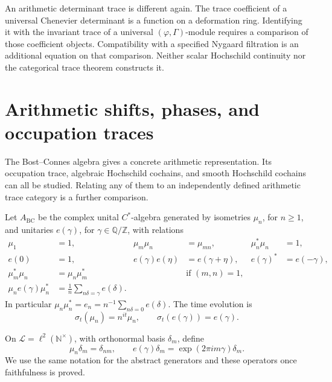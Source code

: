 An arithmetic determinant trace is different again. The trace coefficient of
a universal Chenevier determinant is a function on a deformation ring.
Identifying it with the invariant trace of a universal
$(\varphi,\Gamma)$-module requires a comparison of those coefficient
objects. Compatibility with a specified Nygaard filtration is an additional
equation on that comparison. Neither scalar Hochschild continuity nor the
categorical trace theorem constructs it.

\section{Arithmetic shifts, phases, and occupation traces}

The Bost--Connes algebra gives a concrete arithmetic representation. Its
occupation trace, algebraic Hochschild cochains, and smooth Hochschild
cochains can all be studied. Relating any of them to an independently
defined arithmetic trace category is a further comparison.

\begin{definition}
\label{v4-arith:traces:bc-algebra}
Let $A_{\mathrm{BC}}$ be the complex unital $C^*$-algebra generated by
isometries $\mu_n$, for $n\geq1$, and unitaries $e(\gamma)$, for
$\gamma\in\mathbb Q/\mathbb Z$, with relations
\begin{align*}
 \mu_1&=1,& \mu_m\mu_n&=\mu_{mn},&
 \mu_n^*\mu_n&=1,\\
 e(0)&=1,& e(\gamma)e(\eta)&=e(\gamma+\eta),&
 e(\gamma)^*&=e(-\gamma),\\
 \mu_m^*\mu_n&=\mu_n\mu_m^* &&\text{if }(m,n)=1,\\
 \mu_ne(\gamma)\mu_n^*
   &=\frac1n\sum_{n\delta=\gamma}e(\delta).
\end{align*}
In particular $\mu_n\mu_n^*=e_n=n^{-1}\sum_{n\delta=0}e(\delta)$. The time
evolution is
\[
 \sigma_t(\mu_n)=n^{it}\mu_n,\qquad
 \sigma_t(e(\gamma))=e(\gamma).
\]
\end{definition}

On $\mathcal L=\ell^2(\mathbb N^\times)$, with orthonormal basis $\delta_m$,
define
\[
 \mu_n\delta_m=\delta_{nm},\qquad
 e(\gamma)\delta_m=\exp(2\pi i m\gamma)\delta_m.
\]
We use the same notation for the abstract generators and these operators
once faithfulness is proved.

